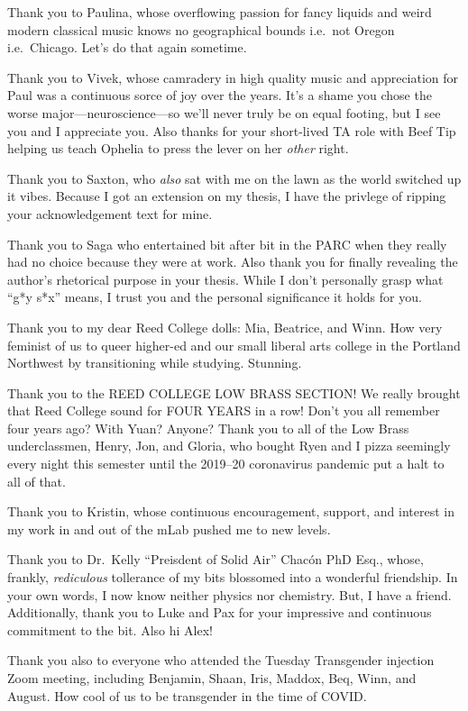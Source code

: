 \documentclass[12pt,twoside]{reedthesis}
\begin{document}
\begin{acknowledgements}
    Thank you to Paulina, whose overflowing passion for fancy liquids and weird modern classical music knows no geographical bounds i.e.~not Oregon i.e.~Chicago. Let's do that again sometime.

    Thank you to Vivek, whose camradery in high quality music and appreciation for Paul was a continuous sorce of joy over the years. It's a shame you chose the worse major---neuroscience---so we'll never truly be on equal footing, but I see you and I appreciate you. Also thanks for your short-lived TA role with Beef Tip helping us teach Ophelia to press the lever on her \emph{other} right.

    Thank you to Saxton, who \emph{also} sat with me on the lawn as the world switched up it vibes. Because I got an extension on my thesis, I have the privlege of ripping your acknowledgement text for mine.

    Thank you to Saga who entertained bit after bit in the PARC when they really had no choice because they were at work. Also thank you for finally revealing the author's rhetorical purpose in your thesis. While I don't personally grasp what ``g*y s*x'' means, I trust you and the personal significance it holds for you.

    Thank you to my dear Reed College dolls: Mia, Beatrice, and Winn. How very feminist of us to queer higher-ed and our small liberal arts college in the Portland Northwest by transitioning while studying. Stunning.

    Thank you to the REED COLLEGE LOW BRASS SECTION! We really brought that Reed College sound for FOUR YEARS in a row! Don't you all remember four years ago? With Yuan? Anyone? Thank you to all of the Low Brass underclassmen, Henry, Jon, and Gloria, who bought Ryen and I pizza seemingly every night this semester until the 2019--20 coronavirus pandemic put a halt to all of that.

    Thank you to Kristin, whose continuous encouragement, support, and interest in my work in and out of the mLab pushed me to new levels.

    Thank you to Dr.~Kelly ``Preisdent of Solid Air'' Chacón PhD Esq., whose, frankly, \emph{rediculous} tollerance of my bits blossomed into a wonderful friendship. In your own words, I now know neither physics nor chemistry. But, I have a friend. Additionally, thank you to Luke and Pax for your impressive and continuous commitment to the bit. Also hi Alex!

    Thank you also to everyone who attended the Tuesday Transgender injection Zoom meeting, including Benjamin, Shaan, Iris, Maddox, Beq, Winn, and August. How cool of us to be transgender in the time of COVID.


\end{acknowledgements}
\end{document}
